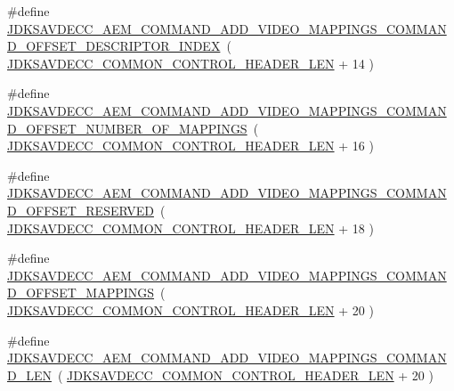 \begin{DoxyCompactItemize}
\item 
\#define \hyperlink{group__command__add__video__mappings_ga7bd69550105c23a44b90d7f22ea0c945}{J\+D\+K\+S\+A\+V\+D\+E\+C\+C\+\_\+\+A\+E\+M\+\_\+\+C\+O\+M\+M\+A\+N\+D\+\_\+\+A\+D\+D\+\_\+\+V\+I\+D\+E\+O\+\_\+\+M\+A\+P\+P\+I\+N\+G\+S\+\_\+\+C\+O\+M\+M\+A\+N\+D\+\_\+\+O\+F\+F\+S\+E\+T\+\_\+\+D\+E\+S\+C\+R\+I\+P\+T\+O\+R\+\_\+\+I\+N\+D\+EX}~( \hyperlink{group__jdksavdecc__avtp__common__control__header_gaae84052886fb1bb42f3bc5f85b741dff}{J\+D\+K\+S\+A\+V\+D\+E\+C\+C\+\_\+\+C\+O\+M\+M\+O\+N\+\_\+\+C\+O\+N\+T\+R\+O\+L\+\_\+\+H\+E\+A\+D\+E\+R\+\_\+\+L\+EN} + 14 )
\item 
\#define \hyperlink{group__command__add__video__mappings_ga6c43a58dadd114a847dc14c5aaff3f85}{J\+D\+K\+S\+A\+V\+D\+E\+C\+C\+\_\+\+A\+E\+M\+\_\+\+C\+O\+M\+M\+A\+N\+D\+\_\+\+A\+D\+D\+\_\+\+V\+I\+D\+E\+O\+\_\+\+M\+A\+P\+P\+I\+N\+G\+S\+\_\+\+C\+O\+M\+M\+A\+N\+D\+\_\+\+O\+F\+F\+S\+E\+T\+\_\+\+N\+U\+M\+B\+E\+R\+\_\+\+O\+F\+\_\+\+M\+A\+P\+P\+I\+N\+GS}~( \hyperlink{group__jdksavdecc__avtp__common__control__header_gaae84052886fb1bb42f3bc5f85b741dff}{J\+D\+K\+S\+A\+V\+D\+E\+C\+C\+\_\+\+C\+O\+M\+M\+O\+N\+\_\+\+C\+O\+N\+T\+R\+O\+L\+\_\+\+H\+E\+A\+D\+E\+R\+\_\+\+L\+EN} + 16 )
\item 
\#define \hyperlink{group__command__add__video__mappings_gadf7153d3fd9eb8136a6f96648085042c}{J\+D\+K\+S\+A\+V\+D\+E\+C\+C\+\_\+\+A\+E\+M\+\_\+\+C\+O\+M\+M\+A\+N\+D\+\_\+\+A\+D\+D\+\_\+\+V\+I\+D\+E\+O\+\_\+\+M\+A\+P\+P\+I\+N\+G\+S\+\_\+\+C\+O\+M\+M\+A\+N\+D\+\_\+\+O\+F\+F\+S\+E\+T\+\_\+\+R\+E\+S\+E\+R\+V\+ED}~( \hyperlink{group__jdksavdecc__avtp__common__control__header_gaae84052886fb1bb42f3bc5f85b741dff}{J\+D\+K\+S\+A\+V\+D\+E\+C\+C\+\_\+\+C\+O\+M\+M\+O\+N\+\_\+\+C\+O\+N\+T\+R\+O\+L\+\_\+\+H\+E\+A\+D\+E\+R\+\_\+\+L\+EN} + 18 )
\item 
\#define \hyperlink{group__command__add__video__mappings_ga451a35fac8c9f1cfac40513d4190d42c}{J\+D\+K\+S\+A\+V\+D\+E\+C\+C\+\_\+\+A\+E\+M\+\_\+\+C\+O\+M\+M\+A\+N\+D\+\_\+\+A\+D\+D\+\_\+\+V\+I\+D\+E\+O\+\_\+\+M\+A\+P\+P\+I\+N\+G\+S\+\_\+\+C\+O\+M\+M\+A\+N\+D\+\_\+\+O\+F\+F\+S\+E\+T\+\_\+\+M\+A\+P\+P\+I\+N\+GS}~( \hyperlink{group__jdksavdecc__avtp__common__control__header_gaae84052886fb1bb42f3bc5f85b741dff}{J\+D\+K\+S\+A\+V\+D\+E\+C\+C\+\_\+\+C\+O\+M\+M\+O\+N\+\_\+\+C\+O\+N\+T\+R\+O\+L\+\_\+\+H\+E\+A\+D\+E\+R\+\_\+\+L\+EN} + 20 )
\item 
\#define \hyperlink{group__command__add__video__mappings_ga17bf1e4da2de98fb9894a6c2926000f5}{J\+D\+K\+S\+A\+V\+D\+E\+C\+C\+\_\+\+A\+E\+M\+\_\+\+C\+O\+M\+M\+A\+N\+D\+\_\+\+A\+D\+D\+\_\+\+V\+I\+D\+E\+O\+\_\+\+M\+A\+P\+P\+I\+N\+G\+S\+\_\+\+C\+O\+M\+M\+A\+N\+D\+\_\+\+L\+EN}~( \hyperlink{group__jdksavdecc__avtp__common__control__header_gaae84052886fb1bb42f3bc5f85b741dff}{J\+D\+K\+S\+A\+V\+D\+E\+C\+C\+\_\+\+C\+O\+M\+M\+O\+N\+\_\+\+C\+O\+N\+T\+R\+O\+L\+\_\+\+H\+E\+A\+D\+E\+R\+\_\+\+L\+EN} + 20 )
\end{DoxyCompactItemize}
